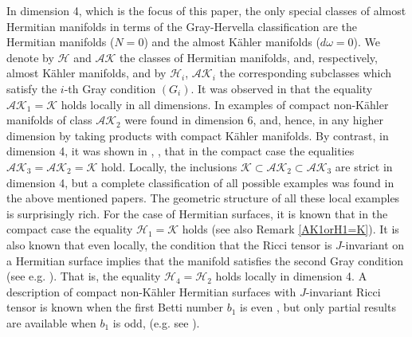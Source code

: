 \documentclass{amsart}
\begin{document}
In dimension 4, which is the focus of this paper, the only special classes of almost Hermitian manifolds in terms of the Gray-Hervella classification \cite{GrHe} are the Hermitian manifolds ($N=0$) and the almost K\"ahler manifolds ($d\omega = 0$). We denote by $\mathcal{H}$ and $\mathcal{AK}$ the classes of Hermitian manifolds, and, respectively, almost K\"ahler manifolds, and by $\mathcal{H}_i$, $\mathcal{AK}_i$ the corresponding subclasses which satisfy the $i$-th Gray condition $(G_i)$.
It was observed in \cite{Go} that the equality $\mathcal{AK}_1 = \mathcal{K}$ holds locally in all dimensions. In \cite{DM} examples of compact non-K\"ahler manifolds of class $\mathcal{AK}_2$ were found in dimension 6, and, hence, in any higher dimension by taking products with compact K\"ahler manifolds. By contrast, in dimension 4, it was shown in \cite{AD-QJM}, \cite{AAD-AGAG}, \cite{AAD} that in the compact case the equalities $\mathcal{AK}_3=\mathcal{AK}_2= \mathcal{K}$ hold. Locally, the inclusions $\mathcal{K} \subset \mathcal{AK}_2 \subset\mathcal{AK}_3 $ are strict in dimension 4, but a complete classification of all possible examples was found in the above mentioned papers. The geometric structure of all these local examples is surprisingly rich. For the case of Hermitian surfaces, it is known that in the compact case the equality $\mathcal{H}_1 = \mathcal{K}$ holds (see also Remark \ref{AK1orH1=K}). It is also known that even locally, the condition that the Ricci tensor is $J$-invariant on a Hermitian surface implies that the manifold satisfies the second Gray condition (see e.g. \cite{AG}). That is, the equality $\mathcal{H}_4= \mathcal{H}_2$ holds locally in dimension 4. A description of compact non-K\"ahler Hermitian surfaces with $J$-invariant Ricci tensor is known when the first Betti number $b_1$ is even \cite{AG}, but only partial results are available when $b_1$ is odd, (e.g. see \cite{Mu}).
\end{document}
